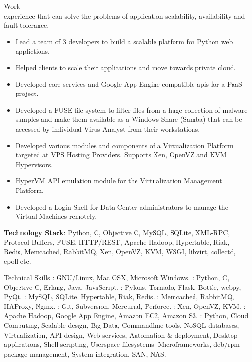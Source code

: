 \documentclass{resume}
\begin{document}
\begin{category}{Work \\experience}
  that can solve the problems of application scalability, availability and fault-tolerance.
  \begin{itemize} 
  \item Lead a team of 3 developers to build a scalable platform for Python web applictions.
  \item Helped clients to scale their applications and move towards private cloud.
  \item Developed core services and Google App Engine compatible apis for a PaaS project.
  \item Developed a FUSE file system to filter files from a huge collection of malware samples 
  and make them available as a Windows Share (Samba) that can be accessed by individual 
  Virus Analyst from their workstations.
  \item Developed various modules and components of a Virtualization Platform targeted at VPS Hosting
  Providers. Supports Xen, OpenVZ and KVM Hypervisors.
  \item HyperVM API emulation module for the Virtualization Management Platform.
  \item Developed a Login Shell for Data Center administrators to manage the
    Virtual Machines remotely.
  \end{itemize}
  \citemnobullet \textbf{Technology Stack}: Python, C, Objective C, MySQL, SQLite, XML-RPC,
  Protocol Buffers, FUSE, HTTP/REST, Apache Hadoop, Hypertable, Riak, Redis,
  Memcached, RabbitMQ, Xen, OpenVZ, KVM, WSGI, libvirt, collectd, epoll etc.
\end{category}

\begin{category}{Technical Skills}
  : GNU/Linux, Mac OSX, Microsoft Windows.
  : Python, C, Objective
  C, Erlang, Java, JavaScript.
  : Pylons, Tornado, Flask, Bottle, webpy, PyQt.
  : MySQL, SQLite, Hypertable, Riak, Redis.
  : Memcached, RabbitMQ, HAProxy, Nginx.
  : Git, Subversion, Mercurial,
  Perforce.
  : Xen, OpenVZ, KVM.
  : Apache Hadoop, Google App Engine, Amazon EC2, Amazon S3.
  : Python, Cloud Computing, Scalable design, Big Data, Commandline 
  tools, NoSQL databases, Virtualization, API design, Web services, Automation \& deployment, 
  Desktop applications, Shell scripting, Userspace filesystems,
  Microframeworks, deb/rpm package management, System integration, SAN, NAS.
\end{category}
\end{document}
